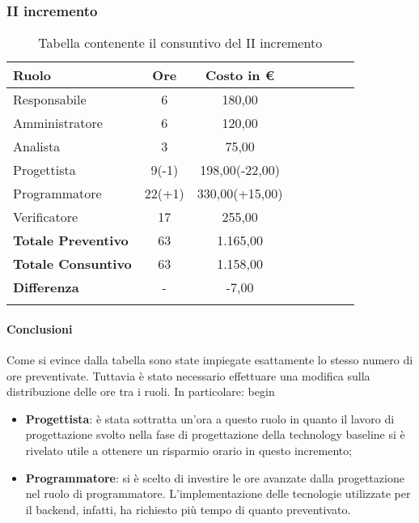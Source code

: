 \subsubsection{II incremento}\label{_consuntivoPoC2}
\begin{longtable}{|l|c|c|c|c|c|c|c|}
	\hline
	\rowcolor{lighter-grayer}
	\textbf{Ruolo}             & \textbf{Ore} & \textbf{Costo in €} \\
	\hline
	\endfirsthead

	\hline
	Responsabile               & 6           & 180,00              \\
	\hline
	\hline
	Amministratore             & 6       & 120,00      \\
	\hline
	\hline
	Analista                   & 3       & 75,00   \\
	\hline
	\hline
	Progettista                & 9(-1)            & 198,00(-22,00)              \\
	\hline
	\hline
	Programmatore              & 22(+1)            & 330,00(+15,00)                   \\
	\hline
	\hline
	Verificatore               & 17       & 255,00    \\
	\hline
	\textbf{Totale Preventivo} & 63          & 1.165,00            \\
	\hline
	\hline
	\textbf{Totale Consuntivo} & 63          & 1.158,00            \\
	\hline
	\hline
	\textbf{Differenza}        & -           & -7,00           \\
	\hline
	\rowcolor{white}
	\caption{Tabella contenente il consuntivo del II incremento}
\end{longtable}
\paragraph{Conclusioni}
Come si evince dalla tabella sono state impiegate esattamente lo stesso numero di ore preventivate. Tuttavia è stato necessario effettuare una modifica sulla distribuzione delle ore tra i ruoli. In particolare:
begin\begin{itemize}
	\item \textbf{Progettista}: è stata sottratta un'ora a questo ruolo in quanto il lavoro di progettazione svolto nella fase di progettazione della technology baseline si è rivelato utile a ottenere un risparmio orario in questo incremento;
	\item \textbf{Programmatore}: si è scelto di investire le ore avanzate dalla progettazione nel ruolo di programmatore. L'implementazione delle tecnologie utilizzate per il backend, infatti, ha richiesto più tempo di quanto preventivato.
\end{itemize} 

